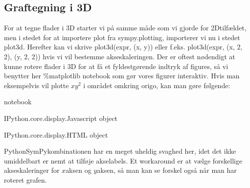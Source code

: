 \documentclass[letterpaper,10pt,english]{jupyterBook}
\begin{document}
\subsection{Graftegning i 3D}
\label{\detokenize{notebooks/sympy/Notebook_FlereVar_analyse:graftegning-i-3d}}
For at tegne flader i 3D starter vi på samme måde som vi gjorde for 2D\sphinxhyphen{}tilfældet, men i stedet for at importere plot fra sympy.plotting, importerer vi nu i stedet plot3d. Herefter kan vi skrive plot3d(expr, (x, y)) eller f.eks. plot3d(expr, (x, \sphinxhyphen{}2, 2), (y, \sphinxhyphen{}2, 2)) hvis vi vil bestemme akseskaleringen. Der er oftest nødendigt at kunne rotere flader i 3D for at få et fyldestgørende indtryk af figures, så vi benytter her \%matplotlib notebook som gør vores figurer interaktiv. Hvis man eksempelvis vil plotte \(xy^2\) i området omkring origo, kan man gøre følgende:

\begin{sphinxVerbatim}[commandchars=\\\{\}]
            
 notebook  

                               
           
\end{sphinxVerbatim}

\begin{sphinxVerbatim}[commandchars=\\\{\}]
\PYGZlt{}IPython.core.display.Javascript object\PYGZgt{}
\end{sphinxVerbatim}

\begin{sphinxVerbatim}[commandchars=\\\{\}]
\PYGZlt{}IPython.core.display.HTML object\PYGZgt{}
\end{sphinxVerbatim}

Python\sphinxhyphen{}SymPy\sphinxhyphen{}kombinationen har en meget uheldig svaghed her, idet det ikke umiddelbart er nemt at tilføje akselabels. Et workaround er at vælge forskellige akseskaleringer for \(x\)\sphinxhyphen{}aksen og \(y\)\sphinxhyphen{}aksen, så man kan se forskel også når man har roteret grafen.
\end{document}
